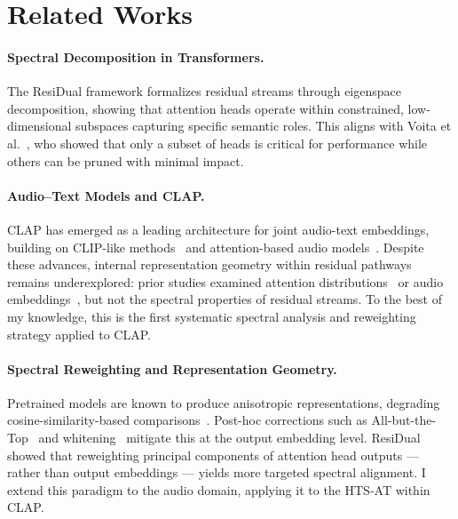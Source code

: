 \section{Related Works}

\paragraph{Spectral Decomposition in Transformers.}
The ResiDual framework formalizes residual streams through 
eigenspace decomposition, showing that attention heads operate within constrained, 
low-dimensional subspaces capturing specific semantic roles. 
This aligns with Voita et al.~\cite{Voita2019}, who showed that only a subset 
of heads is critical for performance while others can be pruned with minimal impact.

\paragraph{Audio–Text Models and CLAP.}
CLAP has emerged as a leading architecture for joint audio-text 
embeddings, building on CLIP-like methods~\cite{radford2021clip} and 
attention-based audio models~\cite{gong2021ast}. 
Despite these advances, internal representation geometry within residual 
pathways remains underexplored: prior studies examined attention 
distributions~\cite{understandingselfattention, studyofattention, musicattention} 
or audio embeddings~\cite{audioembeddings}, but not the spectral properties 
of residual streams. To the best of my knowledge, this is the first systematic 
spectral analysis and reweighting strategy applied to CLAP.

\paragraph{Spectral Reweighting and Representation Geometry.}
Pretrained models are known to produce anisotropic representations, 
degrading cosine-similarity-based comparisons~\cite{contextual}. 
Post-hoc corrections such as All-but-the-Top~\cite{allbutthetop} and 
whitening~\cite{su2021whitening} mitigate this at the output embedding level. 
ResiDual showed that reweighting principal components 
of attention head outputs — rather than output embeddings — yields more targeted 
spectral alignment. I extend this paradigm to the audio domain, applying it to the HTS-AT within CLAP.